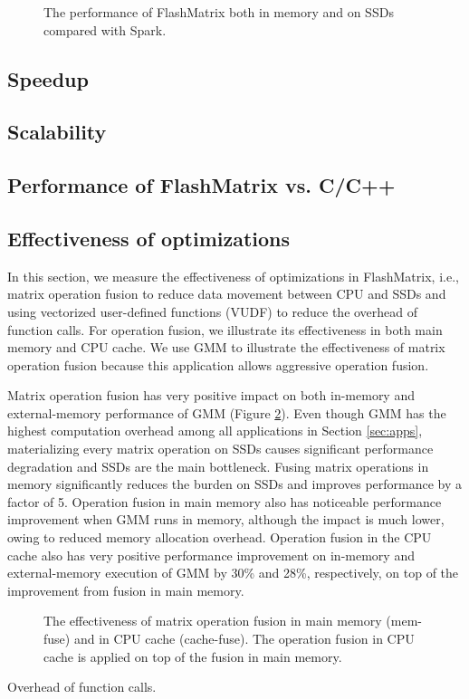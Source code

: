 \begin{figure}
	\begin{center}
		\footnotesize
		
		\caption{The performance of FlashMatrix both in memory and on SSDs
		compared with Spark.}
		\label{perf:fm}
	\end{center}
\end{figure}

\subsection{Speedup}

\subsection{Scalability}

\subsection{Performance of FlashMatrix vs. C/C++}

\subsection{Effectiveness of optimizations}

In this section, we measure the effectiveness of optimizations in FlashMatrix,
i.e., matrix operation fusion to reduce data movement between CPU and SSDs and
using vectorized user-defined functions (VUDF) to reduce the overhead of
function calls. For operation fusion, we illustrate its effectiveness in both
main memory and CPU cache. We use GMM to illustrate the effectiveness of matrix
operation fusion because this application allows aggressive operation fusion.

Matrix operation fusion has very positive impact on both in-memory and
external-memory performance of GMM (Figure \ref{perf:mem_move}). Even though
GMM has the highest computation overhead among all applications in Section
\ref{sec:apps}, materializing every matrix operation on SSDs causes significant
performance degradation and SSDs are the main bottleneck. Fusing matrix
operations in memory significantly reduces the burden on SSDs and improves
performance by a factor of 5. Operation fusion in main memory also has noticeable
performance improvement when GMM runs in memory, although the impact is much
lower, owing to reduced memory allocation overhead. Operation fusion in
the CPU cache also has very positive performance improvement on in-memory
and external-memory execution of GMM by 30\% and 28\%, respectively, on top of
the improvement from fusion in main memory.

\begin{figure}
	\begin{center}
		\footnotesize
		
		\caption{The effectiveness of matrix operation fusion in main memory
			(mem-fuse) and in CPU cache (cache-fuse). The operation fusion in
		CPU cache is applied on top of the fusion in main memory.}
		\label{perf:mem_move}
	\end{center}
\end{figure}

Overhead of function calls.
